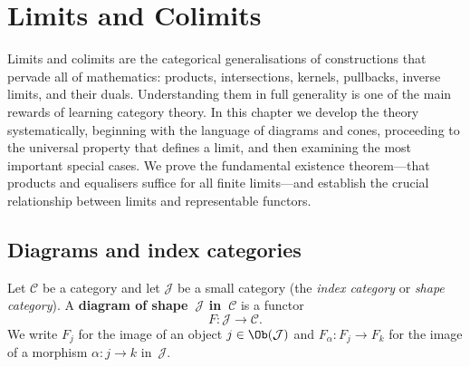 

\chapter{Limits and Colimits}\label{ch:limits-colimits}
\minitoc

\vspace{1em}

Limits and colimits are the categorical generalisations of constructions
that pervade all of mathematics: products, intersections, kernels,
pullbacks, inverse limits, and their duals.  Understanding them in full
generality is one of the main rewards of learning category theory.
In this chapter we develop the theory systematically, beginning with the
language of diagrams and cones, proceeding to the universal property that
defines a limit, and then examining the most important special cases.
We prove the fundamental existence theorem---that products and equalisers
suffice for all finite limits---and establish the crucial relationship
between limits and representable functors.


\section{Diagrams and index categories}\label{sec:diagrams}

\begin{definition}[Diagram]\label{def:diagram}
Let $\mathcal{C}$ be a category and let $\mathcal{J}$ be a small category
(the \emph{index category} or \emph{shape category}).
A \textbf{diagram of shape~$\mathcal{J}$ in~$\mathcal{C}$} is a functor
\[
    F \colon \mathcal{J} \longrightarrow \mathcal{C}.
\]
We write $F_j$ for the image of an object $j \in \Ob(\mathcal{J})$
and $F_\alpha \colon F_j \to F_k$ for the image of a morphism
$\alpha \colon j \to k$ in~$\mathcal{J}$.
\end{definition}

